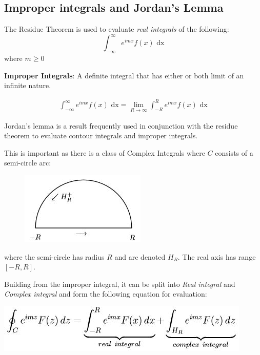 \documentclass[10pt,a4paper]{article}
\begin{document}
\subsection{Improper integrals and Jordan's Lemma}

The Residue Theorem is used to evaluate \textit{real integrals} of the following:
$$
\int_{-\infty}^{\infty} e^{imx}f(x)\text{ dx}
$$
where $m\geq 0$ \par 

\begin{tcolorbox}[breakable,colback=white]
\textbf{Improper Integrals}: A definite integral that has either or both limit of an infinite
nature.

\begin{equation*} 
    \begin{aligned}
        \int_{-\infty}^{\infty} e^{imx}f(x)\text{ dx} = \lim_{R\rightarrow \infty}\int_{-R}^R e^{imx}f(x) \text{ dx}
    \end{aligned}
\end{equation*}
\end{tcolorbox}

Jordan's lemma is a result frequently used in conjunction with the residue theorem to evaluate contour integrals and improper integrals. 

This is important as there is a class of Complex Integrals where $C$ consists of a semi-circle arc: \par
\begin{figure} [h!]
    \centering
    \includegraphics[]{Semicircle.JPG}
    
    \label{fig:Semicircle}
\end{figure}
where the semi-circle has radius $R$ and arc denoted $H_R$. The real axis has range $[-R,R]$. \par 

Building from the improper integral, it can be split into \textit{Real integral} and \textit{Complex
integral} and form the following equation for evaluation:

\begin{center}
    \includegraphics[scale=0.85]{Semi.JPG}
\end{center}
\end{document}
